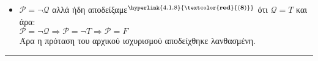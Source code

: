 \begin{tcolorbox}[colback=yellow!15!white, colframe=blue!50!white,
	fonttitle=\bfseries\Large, title = Απόδειξη - μέρος 3/3]
	\begin{itemize}
		\itemsep1em



		\item $\mathcal{P} = \neg{\mathcal{Q}}$ αλλά ήδη
		αποδείξαμε$^{\hyperlink{4.1.8}{\bf{\textcolor{red}{(8)}}}}$ ότι $\mathcal{Q}=T$ και άρα:\\
		$\mathcal{P} = \neg{\mathcal{Q}} \Longrightarrow \mathcal{P} = \neg{T} \Longrightarrow \mathcal{P} = F$\\
		Άρα η πρόταση του αρχικού ισχυρισμού αποδείχθηκε λανθασμένη.

	\begin{comment}
		\item $\mathcal{L}_{union} = \mathcal{L}_{regular} \cup \mathcal{L}_{irregular} \Longrightarrow$
		$\mathcal{L}_{union} = (\mathcal{L}_regular \cup \mathcal{L}_irregular) - ()$

		\item Γνωρίζουμε από τις ιδιότητες των κανονικών γλωσσών ότι είναι κλειστές ως προς την πράξη της ένωσης
		από το οποίο και συνεπάγετε επίσης ότι οποιαδήποτε κανονική γλώσσα γίνεται να αποδομηθεί σε δύο κανονικές
		γλώσσες η ένωση των οποίων την αποτελεί και άρα η ένωση $\mathcal{L}_{irregular}$
	\end{comment}


	\end{itemize}
\end{tcolorbox}
\begin{center}
	\noindent\rule{\linewidth}{0.5pt}
\end{center}
